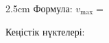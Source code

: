 
\begin{answerboxpart}{2.5cm}
Формула: \(v_\mathrm{max}=\)

\bigskip

Кеңістік нүктелері:
\end{answerboxpart}

